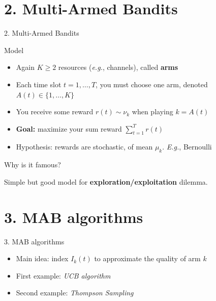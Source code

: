 \documentclass[12pt,english,ignorenonframetext,]{beamer}
\providecommand{\tightlist}{%
  \setlength{\itemsep}{0pt}\setlength{\parskip}{0pt}}
\begin{document}
\section{\hfill{}2. Multi-Armed Bandits\hfill{}}

\begin{frame}{%
\protect\hypertarget{multi-armed-bandits}{%
2. Multi-Armed Bandits}}

\begin{block}{Model}

\begin{itemize}
\tightlist
\item
  Again \(K \geq 2\) resources (\emph{e.g.}, channels), called
  \textbf{arms}
\item
  Each time slot \(t=1,\ldots,T\), you must choose one arm, denoted
  \(A(t)\in\{1,\ldots,K\}\)
\item
  You receive some reward \(r(t) \sim \nu_k\) when playing \(k = A(t)\)
\item
  \textbf{Goal:} maximize your sum reward \(\sum\limits_{t=1}^{T} r(t)\)
\item
  Hypothesis: rewards are stochastic, of mean \(\mu_k\). \emph{E.g.},
  Bernoulli
\end{itemize}

\end{block}

\begin{block}{Why is it famous?}

Simple but good model for \textbf{exploration/exploitation} dilemma.

\end{block}

\end{frame}



\section{\hfill{}3. MAB algorithms\hfill{}}

\begin{frame}{%
\protect\hypertarget{mab-algorithms}{%
3. MAB algorithms}}

\begin{itemize}
\tightlist
\item
  Main idea: index \(I_k(t)\) to approximate the quality of arm \(k\)
\item
  First example: \emph{UCB algorithm}
\item
  Second example: \emph{Thompson Sampling}
\end{itemize}

\end{frame}
\end{document}
